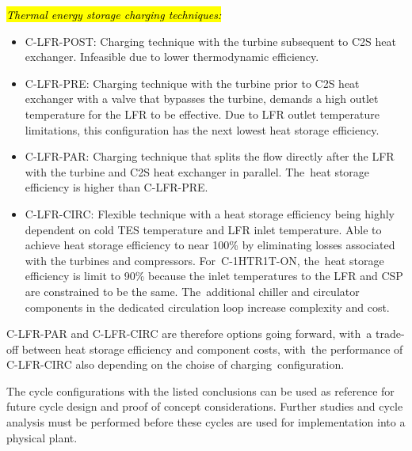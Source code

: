 \documentclass[sustainability,article,accept,moreauthors,pdftex]{Definitions/mdpi}
\begin{document}
\begin{paracol}{2}
\textit{\hl{Thermal energy storage charging techniques:}}
\begin{itemize}
    \item    C-LFR-POST: Charging technique with the turbine subsequent to C2S heat exchanger. Infeasible due to lower thermodynamic efficiency. 
    \item	C-LFR-PRE: Charging technique with the turbine prior to C2S heat exchanger with a valve that bypasses the turbine, demands a high outlet temperature for the LFR to be effective. Due to LFR outlet temperature limitations, this configuration has the next lowest heat storage efficiency.
    \item	C-LFR-PAR: Charging technique that splits the flow directly after the LFR with the turbine and C2S heat exchanger in parallel. The~heat storage efficiency is higher than C-LFR-PRE.
    \item   C-LFR-CIRC: Flexible technique with a heat storage efficiency being highly dependent on cold TES temperature and LFR inlet temperature. Able to achieve heat storage efficiency to near 100\% by eliminating losses associated with the turbines and compressors. For~C-1HTR1T-ON, the~heat storage efficiency is limit to 90\% because the inlet temperatures to the LFR and CSP are constrained to be the same. The~additional chiller and circulator components in the dedicated circulation loop increase complexity and cost. 
\end{itemize}

C-LFR-PAR and C-LFR-CIRC are therefore options going forward, with~a trade-off between heat storage efficiency and component costs, with~the performance of C-LFR-CIRC also depending on the choise of charging~configuration.

The cycle configurations with the listed conclusions can be used as reference for future cycle design and proof of concept considerations. Further studies and cycle analysis must be performed before these cycles are used for implementation into a physical plant. 
\vspace{6pt} 



\end{paracol}
\end{document}
